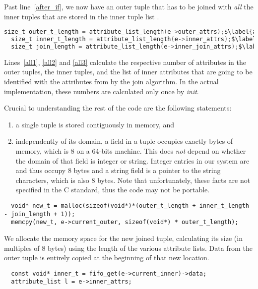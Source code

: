 \documentclass[11pt]{article}
\begin{document}
{{Past line~\ref{after_if}, we now have an outer tuple  that has to be joined with \emph{all} the inner tuples
that are stored in the inner tuple list .

\begin{lstlisting}[language=C]
  size_t outer_t_length = attribute_list_length(e->outer_attrs);$\label{all1}$
  size_t inner_t_length = attribute_list_length(e->inner_attrs);$\label{all2}$
  size_t join_length = attribute_list_length(e->inner_join_attrs);$\label{all3}$
\end{lstlisting}

Lines~\ref{all1}, \ref{all2} and \ref{all3} calculate the respective number of attributes in
the outer tuples,
the inner tuples, and
the list of inner attributes that are going to be identified with the attributes from  by the join algorithm.
In the actual implementation, these numbers are calculated only once by \emph{init}.

Crucial to understanding the rest of the code are the following statements:
\begin{enumerate}[noitemsep, topsep=0pt, label=(\alph*)]
\item a single tuple is stored contiguously in memory, and
\item independently of its domain, a field in a tuple occupies exactly  bytes of memory, which is 8 on a 64-bits machine.
This does \emph{not} depend on whether the domain of that field is integer or string.
Integer entries in our system are  and thus occupy 8 bytes and a string field is a pointer to the string characters, which is also 8 bytes.
Note that unfortunately, these facts are not specified in the C standard, thus the code may not be portable.
\end{enumerate}

\begin{lstlisting}
  void* new_t = malloc(sizeof(void*)*(outer_t_length + inner_t_length - join_length + 1));
  memcpy(new_t, e->current_outer, sizeof(void*) * outer_t_length);
\end{lstlisting}

We allocate the memory space for the new joined tuple, calculating its size (in multiples of 8 bytes) using the length of the various attribute lists.
Data from the outer tuple is entirely copied at the beginning of that new location.

\begin{lstlisting}
  const void* inner_t = fifo_get(e->current_inner)->data;
  attribute_list l = e->inner_attrs;
\end{lstlisting}

}}
\end{document}
